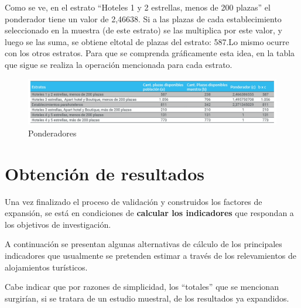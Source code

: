 \documentclass[
]{book}
\begin{document}
Como se ve, en el estrato ``Hoteles 1 y 2 estrellas, menos de 200 plazas'' el ponderador tiene un valor de 2,46638. Si a las plazas de cada establecimiento seleccionado en la muestra (de este estrato) se las multiplica por este valor, y luego se las suma, se obtiene eltotal de plazas del estrato: 587.Lo mismo ocurre con los otros estratos. Para que se comprenda gráficamente esta idea, en la tabla que sigue se realiza la operación mencionada para cada estrato.

\begin{figure}

{\centering \includegraphics[width=1\linewidth]{imagenes/tabla_7b} 

}

\caption{Ponderadores}\label{fig:tabla7A}
\end{figure}

\hypertarget{obtenciuxf3n-de-resultados}{%
\section{Obtención de resultados}\label{obtenciuxf3n-de-resultados}}

Una vez finalizado el proceso de validación y construidos los factores de expansión, se está en condiciones de \textbf{calcular los indicadores} que respondan a los objetivos de investigación.

A continuación se presentan algunas alternativas de cálculo de los principales indicadores que usualmente se pretenden estimar a través de los relevamientos de alojamientos turísticos.

Cabe indicar que por razones de simplicidad, los ``totales'' que se mencionan surgirían, si se tratara de un estudio muestral, de los resultados ya expandidos.
\end{document}

